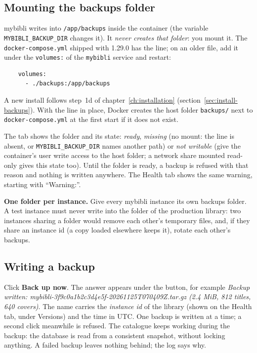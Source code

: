 \subsection*{Mounting the backups folder}

mybibli writes into \texttt{/app/backups} inside the container (the
variable \texttt{MYBIBLI\_BACKUP\_DIR} changes it). It \emph{never
creates that folder}: you mount it. The \texttt{docker-compose.yml}
shipped with 1.29.0 has the line; on an older file, add it under the
\texttt{volumes:} of the \texttt{mybibli} service and restart:

\begin{lstlisting}
    volumes:
      - ./backups:/app/backups
\end{lstlisting}

A new install follows step~1d of chapter~\ref{ch:installation}
(section~\ref{sec:install-backups}). With the line in place, Docker
creates the host folder \texttt{backups/} next to
\texttt{docker-compose.yml} at the first start if it does not exist.

The tab shows the folder and its state: \emph{ready}, \emph{missing}
(no mount: the line is absent, or \texttt{MYBIBLI\_BACKUP\_DIR} names
another path) or \emph{not writable} (give the container's user write
access to the host folder; a network share mounted read-only gives
this state too). Until the folder is ready, a backup is refused with
that reason and nothing is written anywhere. The Health tab shows the
same warning, starting with ``Warning:''.

\textbf{One folder per instance.} Give every mybibli instance its own
backups folder. A test instance must never write into the folder of
the production library: two instances sharing a folder would remove
each other's temporary files, and, if they share an instance id (a
copy loaded elsewhere keeps it), rotate each other's backups.

\subsection*{Writing a backup}

Click \textbf{Back up now}. The answer appears under the button, for
example \emph{Backup written:
mybibli-3f9c0a1b2c3d4e5f-20261125T070409Z.tar.gz (2.4 MiB, 812 titles,
640 covers)}. The name carries the \emph{instance id} of the library
(shown on the Health tab, under Versions) and the time in UTC. One
backup is written at a time; a second click meanwhile is refused.
The catalogue keeps working during the backup: the database is read
from a consistent snapshot, without locking anything. A failed backup
leaves nothing behind; the log says why.

